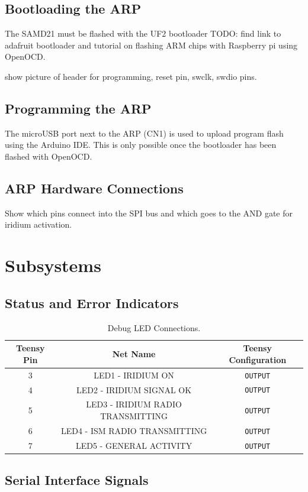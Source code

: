 \documentclass{article}
\begin{document}
\subsection{Bootloading the ARP}
The SAMD21 must be flashed with the UF2 bootloader
TODO: find link to adafruit bootloader and tutorial on flashing  ARM chips with Raspberry pi using OpenOCD.

show picture of header for programming, reset pin, swclk, swdio pins. 
\subsection{Programming the ARP}
The microUSB port next to the ARP (CN1) is used to upload program flash using the Arduino IDE. This is only possible once the bootloader has been flashed with OpenOCD.

\subsection{ARP Hardware Connections}
Show which pins connect into the SPI bus and which goes to the AND gate for iridium activation.

\section{Subsystems}

\subsection{Status and Error Indicators}
\begin{table}[H]
    \centering
    \begin{tabular}{c|c|c}
    Teensy Pin & Net Name     & Teensy Configuration \\
    \hline 
    3 & LED1 - IRIDIUM ON        &   \texttt{OUTPUT}\\
    4 & LED2 - IRIDIUM SIGNAL OK       &   \texttt{OUTPUT}\\
    5 & LED3 - IRIDIUM RADIO TRANSMITTING       &   \texttt{OUTPUT}\\
    6 & LED4 - ISM RADIO TRANSMITTING       &   \texttt{OUTPUT}\\
    7 & LED5 - GENERAL ACTIVITY       &   \texttt{OUTPUT}
    \end{tabular}
    \caption{Debug LED Connections.}
    \label{tab:pins_leds}
\end{table}

\subsection{Serial Interface Signals}
\end{document}
